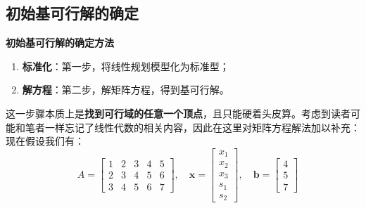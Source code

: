     \subsection{初始基可行解的确定}
    \label{2.4.1}
    \begin{notebox}{\textbf{初始基可行解的确定方法}}
        \begin{enumerate}
            \item \textbf{标准化}：第一步，将线性规划模型化为标准型；
            \item \textbf{解方程}：第二步，解矩阵方程，得到基可行解。
        \end{enumerate}
    \end{notebox}
    这一步骤本质上是\textbf{找到可行域的任意一个顶点}，且只能硬着头皮算。考虑到读者可能和笔者一样忘记了线性代数的相关内容，因此在这里对矩阵方程解法加以补充：
    现在假设我们有：
    \[
    \quad
    A = \begin{bmatrix}
    1 & 2 & 3 & 4 & 5 \\
    2 & 3 & 4 & 5 & 6 \\
    3 & 4 & 5 & 6 & 7
    \end{bmatrix}, \quad
    \mathbf{x} = \begin{bmatrix}
    x_1 \\
    x_2 \\
    x_3 \\
    s_1 \\
    s_2
    \end{bmatrix}, \quad
    \mathbf{b} = \begin{bmatrix}
    4 \\
    5 \\
    7
    \end{bmatrix}
    \] 
